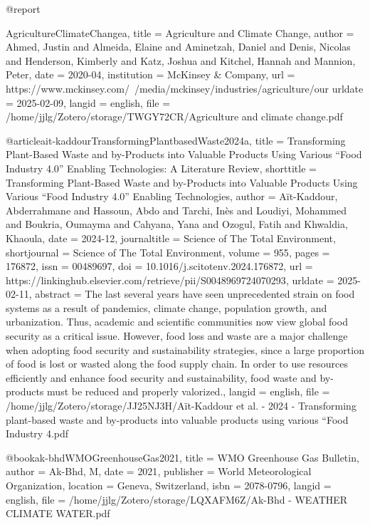 @report{AgricultureClimateChangea,
  title = {Agriculture and Climate Change},
  author = {Ahmed, Justin and Almeida, Elaine and Aminetzah, Daniel and Denis, Nicolas and Henderson, Kimberly and Katz, Joshua and Kitchel, Hannah and Mannion, Peter},
  date = {2020-04},
  institution = {McKinsey \& Company},
  url = {https://www.mckinsey.com/~/media/mckinsey/industries/agriculture/our%
  urldate = {2025-02-09},
  langid = {english},
  file = {/home/jjlg/Zotero/storage/TWGY72CR/Agriculture and climate change.pdf}
}

@article{ait-kaddourTransformingPlantbasedWaste2024a,
  title = {Transforming Plant-Based Waste and by-Products into Valuable Products Using Various “{{Food Industry}} 4.0” Enabling Technologies: {{A}} Literature Review},
  shorttitle = {Transforming Plant-Based Waste and by-Products into Valuable Products Using Various “{{Food Industry}} 4.0” Enabling Technologies},
  author = {Aït-Kaddour, Abderrahmane and Hassoun, Abdo and Tarchi, Inès and Loudiyi, Mohammed and Boukria, Oumayma and Cahyana, Yana and Ozogul, Fatih and Khwaldia, Khaoula},
  date = {2024-12},
  journaltitle = {Science of The Total Environment},
  shortjournal = {Science of The Total Environment},
  volume = {955},
  pages = {176872},
  issn = {00489697},
  doi = {10.1016/j.scitotenv.2024.176872},
  url = {https://linkinghub.elsevier.com/retrieve/pii/S0048969724070293},
  urldate = {2025-02-11},
  abstract = {The last several years have seen unprecedented strain on food systems as a result of pandemics, climate change, population growth, and urbanization. Thus, academic and scientific communities now view global food security as a critical issue. However, food loss and waste are a major challenge when adopting food security and sustainability strategies, since a large proportion of food is lost or wasted along the food supply chain. In order to use resources efficiently and enhance food security and sustainability, food waste and by-products must be reduced and properly valorized.},
  langid = {english},
  file = {/home/jjlg/Zotero/storage/JJ25NJ3H/Aït-Kaddour et al. - 2024 - Transforming plant-based waste and by-products into valuable products using various “Food Industry 4.pdf}
}

@book{ak-bhdWMOGreenhouseGas2021,
  title = {{{WMO}} Greenhouse Gas Bulletin},
  author = {Ak-Bhd, M},
  date = {2021},
  publisher = {World Meteorological Organization},
  location = {Geneva, Switzerland},
  isbn = {2078-0796},
  langid = {english},
  file = {/home/jjlg/Zotero/storage/LQXAFM6Z/Ak-Bhd - WEATHER CLIMATE WATER.pdf}
}

}
